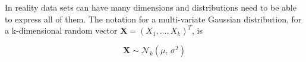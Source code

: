 In reality data sets can have many dimensions and distributions need to be able to express all of them. The notation for a multi-variate Gaussian distribution, for a k-dimensional random vector $ \bm{X} = (X_1,\hdots,X_k)^T$, is

\begin{equation}
    \bm{X} \sim \mathcal{N}_k(\mu,\,\sigma^{2})
\label{eq:multigauss}
\end{equation}






  
  
